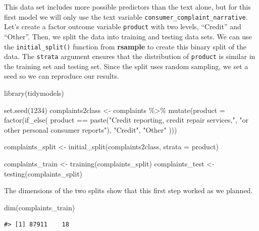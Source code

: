 \documentclass[
]{krantz}
\makeatletter
\newenvironment{Shaded}{\begin{snugshade}}{\end{snugshade}}
\newcommand{\AttributeTok}[1]{\textcolor[rgb]{0.77,0.63,0.00}{#1}}
\newcommand{\DecValTok}[1]{\textcolor[rgb]{0.00,0.00,0.81}{#1}}
\newcommand{\FunctionTok}[1]{\textcolor[rgb]{0.00,0.00,0.00}{#1}}
\newcommand{\NormalTok}[1]{#1}
\newcommand{\OtherTok}[1]{\textcolor[rgb]{0.56,0.35,0.01}{#1}}
\newcommand{\SpecialCharTok}[1]{\textcolor[rgb]{0.00,0.00,0.00}{#1}}
\newcommand{\StringTok}[1]{\textcolor[rgb]{0.31,0.60,0.02}{#1}}
\newenvironment{kframe}{%
\medskip{}
\setlength{\fboxsep}{.8em}
 \def\at@end@of@kframe{}%
 \ifinner\ifhmode%
  \def\at@end@of@kframe{\end{minipage}}%
  \begin{minipage}{\columnwidth}%
 \fi\fi%
 \def\FrameCommand##1{\hskip\@totalleftmargin \hskip-\fboxsep
 \colorbox{shadecolor}{##1}\hskip-\fboxsep
     \hskip-\linewidth \hskip-\@totalleftmargin \hskip\columnwidth}%
 \MakeFramed {\advance\hsize-\width
   \@totalleftmargin\z@ \linewidth\hsize
   \@setminipage}}%
 {\par\unskip\endMakeFramed%
 \at@end@of@kframe}
\renewenvironment{Shaded}{\begin{kframe}}{\end{kframe}}
\makeatother
\begin{document}
This data set includes more possible predictors than the text alone, but for this first model we will only use the text variable \texttt{consumer\_complaint\_narrative}.
Let's create a factor outcome variable \texttt{product} with two levels, ``Credit'' and ``Other''.
Then, we split the data into training and testing data sets.
We can use the \texttt{initial\_split()} function from \textbf{rsample} to create this binary split of the data.
The \texttt{strata} argument ensures that the distribution of \texttt{product} is similar in the training set and testing set.
Since the split uses random sampling, we set a seed so we can reproduce our results.

\begin{Shaded}
\begin{Highlighting}[]
\FunctionTok{library}\NormalTok{(tidymodels)}

\FunctionTok{set.seed}\NormalTok{(}\DecValTok{1234}\NormalTok{)}
\NormalTok{complaints2class }\OtherTok{\textless{}{-}}\NormalTok{ complaints }\SpecialCharTok{\%\textgreater{}\%}
  \FunctionTok{mutate}\NormalTok{(}\AttributeTok{product =} \FunctionTok{factor}\NormalTok{(}\FunctionTok{if\_else}\NormalTok{(}
\NormalTok{    product }\SpecialCharTok{==} \FunctionTok{paste}\NormalTok{(}\StringTok{"Credit reporting, credit repair services,"}\NormalTok{,}
                     \StringTok{"or other personal consumer reports"}\NormalTok{),}
    \StringTok{"Credit"}\NormalTok{, }\StringTok{"Other"}
\NormalTok{  )))}

\NormalTok{complaints\_split }\OtherTok{\textless{}{-}} \FunctionTok{initial\_split}\NormalTok{(complaints2class, }\AttributeTok{strata =}\NormalTok{ product)}

\NormalTok{complaints\_train }\OtherTok{\textless{}{-}} \FunctionTok{training}\NormalTok{(complaints\_split)}
\NormalTok{complaints\_test }\OtherTok{\textless{}{-}} \FunctionTok{testing}\NormalTok{(complaints\_split)}
\end{Highlighting}
\end{Shaded}

The dimensions of the two splits show that this first step worked as we planned.

\begin{Shaded}
\begin{Highlighting}[]
\FunctionTok{dim}\NormalTok{(complaints\_train)}
\end{Highlighting}
\end{Shaded}

\begin{verbatim}
#> [1] 87911    18
\end{verbatim}
\end{document}
